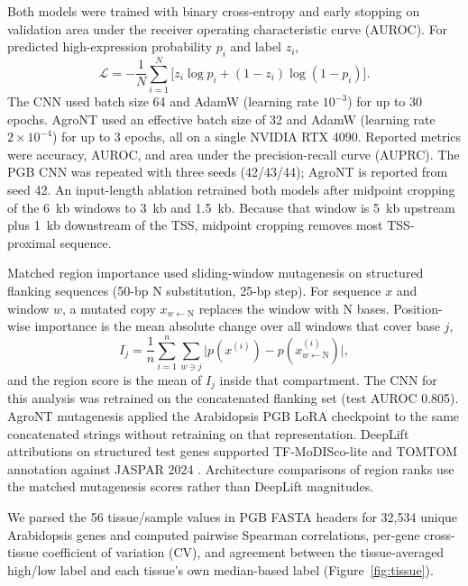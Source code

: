 \documentclass[9pt,twocolumn,twoside,lineno]{gsag3jnl}
\begin{document}
Both models were trained with binary cross-entropy and early stopping on validation area under the receiver operating characteristic curve (AUROC). For predicted high-expression probability $p_i$ and label $z_i$,
\begin{equation}
\mathcal{L}=-\frac{1}{N}\sum_{i=1}^{N}\bigl[z_i\log p_i+(1-z_i)\log(1-p_i)\bigr].
\label{eq:bce}
\end{equation}
The CNN used batch size 64 and AdamW (learning rate $10^{-3}$) for up to 30 epochs. AgroNT used an effective batch size of 32 and AdamW (learning rate $2\times10^{-4}$) for up to 3 epochs, all on a single NVIDIA RTX 4090. Reported metrics were accuracy, AUROC, and area under the precision-recall curve (AUPRC). The PGB CNN was repeated with three seeds (42/43/44); AgroNT is reported from seed 42. An input-length ablation retrained both models after midpoint cropping of the 6~kb windows to 3~kb and 1.5~kb. Because that window is 5~kb upstream plus 1~kb downstream of the TSS, midpoint cropping removes most TSS-proximal sequence.

Matched region importance used sliding-window mutagenesis on structured flanking sequences (50-bp N substitution, 25-bp step). For sequence $x$ and window $w$, a mutated copy $x_{w\leftarrow\mathrm{N}}$ replaces the window with N bases. Position-wise importance is the mean absolute change over all windows that cover base $j$,
\begin{equation}
I_j=\frac{1}{n}\sum_{i=1}^{n}\sum_{w\ni j}\bigl|p(x^{(i)})-p(x^{(i)}_{w\leftarrow\mathrm{N}})\bigr|,
\label{eq:mut}
\end{equation}
and the region score is the mean of $I_j$ inside that compartment. The CNN for this analysis was retrained on the concatenated flanking set (test AUROC 0.805). AgroNT mutagenesis applied the Arabidopsis PGB LoRA checkpoint to the same concatenated strings without retraining on that representation. DeepLift attributions \citep{shrikumar2017} on structured test genes supported TF-MoDISco-lite \citep{shrikumar2018} and TOMTOM annotation against JASPAR 2024 \citep{rauluseviciute2024}. Architecture comparisons of region ranks use the matched mutagenesis scores rather than DeepLift magnitudes.

We parsed the 56 tissue/sample values in PGB FASTA headers for 32,534 unique Arabidopsis genes and computed pairwise Spearman correlations, per-gene cross-tissue coefficient of variation (CV), and agreement between the tissue-averaged high/low label and each tissue's own median-based label (Figure~\ref{fig:tissue}).
\end{document}
